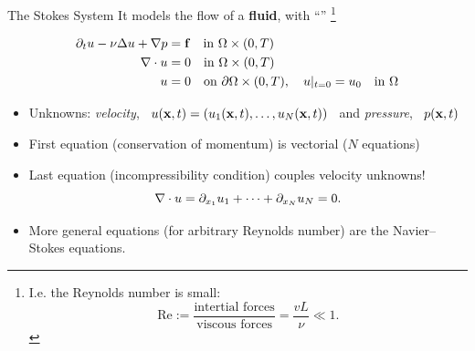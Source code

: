 \begin{frame}{The Stokes System}
  It models the flow of a \textit{}
  \textit{} \textbf{fluid}, with
  ``\textit{}''%
  \footnote{\scriptsize {I.e. the Reynolds number is small:
    $$
    \text{Re}:=\frac{\text{intertial forces}}{\text{viscous forces}}
    =\frac{vL}{\nu} \ll 1.
    $$
  }}
\begin{BlockNoTitle}
  \vspace{-1.2em}
  \begin{align*}
    \partial_t u - \nu \Delta u + \nabla p &= \mathbf{f} \quad\text{in }\Omega\times(0,T)
    \\
    \nabla\cdot{}u &= 0 \quad\text{in }\Omega\times (0,T)
    \\
    u &= 0 \quad\text{on } \partial\Omega\times (0,T), \quad u|_{t=0} = u_0 \quad\text{in } \Omega
  \end{align*}
\end{BlockNoTitle}
\vspace{-0.5em}
\begin{small}
  \begin{itemize}
  \setlength{\itemsep}{-0.1em}
\item Unknowns: \emph{\alert{velocity}}, \
  $u(\mathbf{x},t)=(u_1(\mathbf{x},t),\dots,u_N(\mathbf{x},t))$ \ and
  \emph{\alert{pressure}}, \ $p(\mathbf{x},t)$
  \item First equation (\alert{conservation of momentum}) is vectorial ($N$ equations)
  \item Last equation (\alert{incompressibility condition}) couples velocity unknowns!
    $$\nabla\cdot{}u = \partial_{x_1}u_1+\cdots+\partial_{x_N}u_N=0.$$
  \item \scriptsize{More general equations (for arbitrary Reynolds
      number) are the \alert{Navier--Stokes} equations.}
  \end{itemize}
\end{small}
\end{frame}


